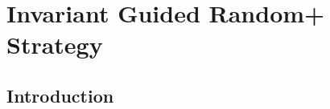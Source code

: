 \chapter{Invariant Guided Random+ Strategy}
\label{chap:IGR+S}

\section{Introduction}\label{sec:intro}






